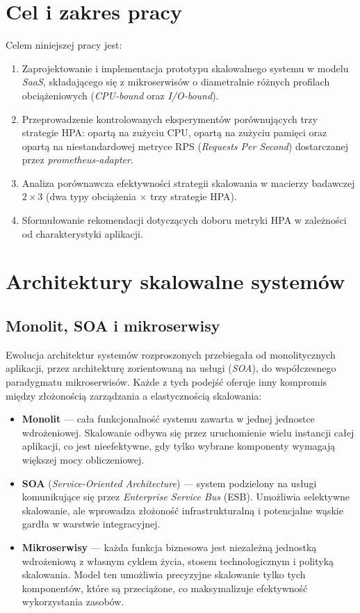 \section{Cel i zakres pracy}

Celem niniejszej pracy jest:

\begin{enumerate}
  \item Zaprojektowanie i implementacja prototypu skalowalnego systemu w modelu \textit{SaaS}, składającego się z mikroserwisów o diametralnie różnych profilach obciążeniowych (\textit{CPU-bound} oraz \textit{I/O-bound}).
  \item Przeprowadzenie kontrolowanych eksperymentów porównujących trzy strategie HPA: opartą na zużyciu CPU, opartą na zużyciu pamięci oraz opartą na niestandardowej metryce RPS (\textit{Requests Per Second}) dostarczanej przez \textit{prometheus-adapter}.
  \item Analiza porównawcza efektywności strategii skalowania w macierzy badawczej $2 \times 3$ (dwa typy obciążenia $\times$ trzy strategie HPA).
  \item Sformułowanie rekomendacji dotyczących doboru metryki HPA w zależności od charakterystyki aplikacji.
\end{enumerate}

\section{Architektury skalowalne systemów}

\subsection{Monolit, SOA i mikroserwisy}

Ewolucja architektur systemów rozproszonych przebiegała od monolitycznych aplikacji, przez architekturę zorientowaną na usługi (\textit{SOA}), do współczesnego paradygmatu mikroserwisów. Każde z tych podejść oferuje inny kompromis między złożonością zarządzania a elastycznością skalowania:

\begin{itemize}
  \item \textbf{Monolit} — cała funkcjonalność systemu zawarta w jednej jednostce wdrożeniowej. Skalowanie odbywa się przez uruchomienie wielu instancji całej aplikacji, co jest nieefektywne, gdy tylko wybrane komponenty wymagają większej mocy obliczeniowej.
  \item \textbf{SOA} (\textit{Service-Oriented Architecture}) — system podzielony na usługi komunikujące się przez \textit{Enterprise Service Bus} (ESB). Umożliwia selektywne skalowanie, ale wprowadza złożoność infrastrukturalną i potencjalne wąskie gardła w warstwie integracyjnej.
  \item \textbf{Mikroserwisy} — każda funkcja biznesowa jest niezależną jednostką wdrożeniową z własnym cyklem życia, stosem technologicznym i polityką skalowania. Model ten umożliwia precyzyjne skalowanie tylko tych komponentów, które są przeciążone, co maksymalizuje efektywność wykorzystania zasobów.
\end{itemize}

